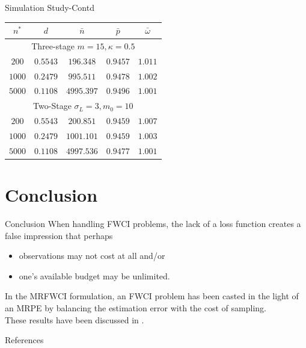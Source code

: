\documentclass [xcolor=svgnames, t] {beamer}
\begin{document}
\begin{frame}{Simulation Study-Contd}
\vspace{7mm}

 \begin{center}
\begin{tabular}{c c c c c} 
 \hline
 $n^*$ & $d$ & $\bar{n}$ & $\bar{p}$ & $\bar{\omega}$\\
 \hline
 \multicolumn{5}{c}{Three-stage $m=15,\kappa=0.5$}\\
  \hline
 $200$ & $0.5543$ & $196.348$ & $0.9457$  & $1.011$\\ 
 $1000$ & $0.2479$ & $995.511$ & $0.9478$ & $1.002$ \\ 
  $5000$ & $0.1108$ & $4995.397$ & $0.9496$ & $1.001$ \\ 
  \hline
\multicolumn{5}{c}{Two-Stage $\sigma_L=3, m_0=10$}\\
 \hline
 $200$ & $0.5543$ & $200.851$ & $0.9459$ & $1.007$ \\ 
 $1000$ & $0.2479$ & $1001.101$ & $0.9459$  & $1.003$\\ 
  $5000$ & $0.1108$ & $4997.536$ & $0.9477$  & $1.001$\\ 
 \hline
\end{tabular}
\end{center}
    
\end{frame}


    

\section{Conclusion}
\begin{frame}{Conclusion}
\vspace{5mm}
When handling FWCI problems, the lack of a loss function creates a false impression that perhaps 
\begin{itemize}
\item observations may not cost at all and/or 
\item one's available budget may be unlimited. 
\end{itemize}
In the MRFWCI formulation, an FWCI problem has been casted in the light of an MRPE by 
balancing the estimation error with the cost of sampling.\\
\vspace{0.2cm}
These results have been discussed in \cite{mrfwci2022}.
\end{frame}

\begin{frame}[allowframebreaks]{References}





\end{frame}
\end{document}
